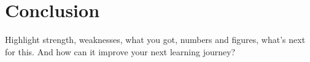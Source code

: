 \chapter{Conclusion}


Highlight strength, weaknesses, what you got, numbers and figures, what's next for this. And how can it improve your next learning journey?
